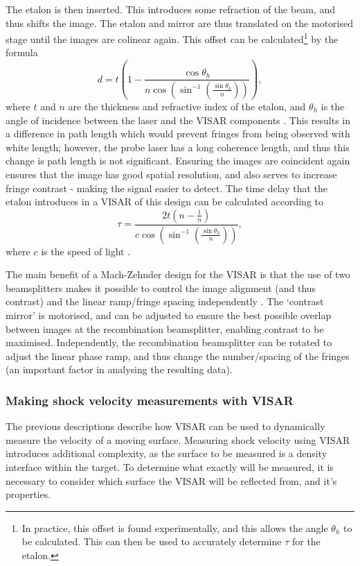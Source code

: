 The etalon is then inserted. This introduces some refraction of the beam, and thus shifts the image. The etalon and mirror are thus translated on the motorised stage until the images are colinear again. This offset can be calculated\footnote{In practice, this offset is found experimentally, and this allows the angle $\theta_h$ to be calculated. This can then be used to accurately determine $\tau$ for the etalon.} by the formula \begin{equation} d = t \left(1 - \frac{\cos\theta_h}{n \cos(\sin^{-1}(\frac{\sin\theta_h}{n}))}\right), \end{equation} where $t$ and $n$ are the thickness and refractive index of the etalon, and $\theta_h$ is the angle of incidence between the laser and the VISAR components \cite{Bolme2013}. This results in a difference in path length which would prevent fringes from being observed with white length; however, the probe laser has a long coherence length, and thus this change is path length is not significant. Ensuring the images are coincident again ensures that the image has good spatial resolution, and also serves to increase fringe contrast - making the signal easier to detect. The time delay that the etalon introduces in a VISAR of this design can be calculated according to \begin{equation} \tau = \frac{2t (n - \frac{1}{n})}{c \cos(\sin^{-1}(\frac{\sin\theta_h}{n}))}, \end{equation} where $c$ is the speed of light \cite{Bolme2013}. 

The main benefit of a Mach-Zehnder design for the VISAR is that the use of two beamsplitters makes it possible to control the image alignment (and thus contrast) and the linear ramp/fringe spacing independently \cite{Celliers2004}. The `contrast mirror' is motorised, and can be adjusted to ensure the best possible overlap between images at the recombination beamsplitter, enabling contrast to be maximised. Independently, the recombination beamsplitter can be rotated to adjust the linear phase ramp, and thus change the number/spacing of the fringes (an important factor in analysing the resulting data). 

\subsubsection{Making shock velocity measurements with VISAR}

The previous descriptions describe how VISAR can be used to dynamically measure the velocity of a moving surface. Measuring shock velocity using VISAR introduces additional complexity, as the surface to be measured is a density interface within the target. To determine what exactly will be measured, it is necessary to consider which surface the VISAR will be reflected from, and it's properties.

